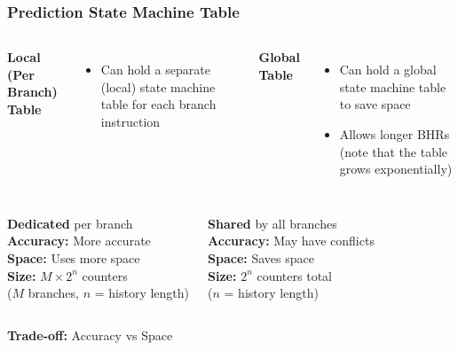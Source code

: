 \documentclass[aspectratio=169,12pt]{beamer}
\begin{document}
\begin{frame}
  \frametitle{Prediction State Machine Table}

  \begin{columns}[t]
    \textbf{\large Local (Per Branch) Table}
    \vspace{0.1em}
    \begin{itemize}
      \item Can hold a separate (local) state machine table for each branch instruction
    \end{itemize}

    \textbf{\large Global Table}
    \vspace{0.1em}
    \begin{itemize}
      \item Can hold a global state machine table to save space
      \item Allows longer BHRs (note that the table grows exponentially)
    \end{itemize}
  \end{columns}

  \vspace{-0.8em}
  \begin{columns}[t]
    \begin{tcolorbox}[colback=green!5, colframe=green!40, boxrule=0.8pt, height=3.2cm]
      \footnotesize
      \textbf{Dedicated} per branch\\[0.3em]
      \textbf{Accuracy:} {\color{green!70!black}\checkmark} More accurate\\[0.3em]
      \textbf{Space:} {\color{red!70!black}\texttimes} Uses more space\\[0.3em]
      \textbf{Size:} $M \times 2^n$ counters\\
      \hspace*{1em}($M$ branches, $n$ = history length)
    \end{tcolorbox}

    \begin{tcolorbox}[colback=blue!5, colframe=blue!40, boxrule=0.8pt, height=3.2cm]
      \footnotesize
      \textbf{Shared} by all branches\\[0.3em]
      \textbf{Accuracy:} {\color{red!70!black}\texttimes} May have conflicts\\[0.3em]
      \textbf{Space:} {\color{green!70!black}\checkmark} Saves space\\[0.3em]
      \textbf{Size:} $2^n$ counters total\\
      \hspace*{1em}($n$ = history length)
    \end{tcolorbox}
  \end{columns}

  \vspace{-0.1em}
  \begin{tcolorbox}[colback=orange!10, colframe=orange!50]
    \centering
    \textbf{Trade-off:} Accuracy vs Space
  \end{tcolorbox}
\end{frame}
\end{document}
